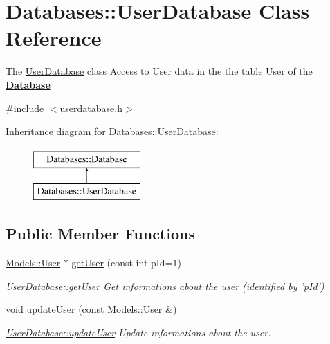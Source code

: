\hypertarget{classDatabases_1_1UserDatabase}{\section{Databases\-:\-:User\-Database Class Reference}
\label{classDatabases_1_1UserDatabase}
}


The \hyperlink{classDatabases_1_1UserDatabase}{User\-Database} class Access to User data in the the table User of the {\bfseries \hyperlink{classDatabases_1_1Database}{Database}}  




{\ttfamily \#include $<$userdatabase.\-h$>$}

Inheritance diagram for Databases\-:\-:User\-Database\-:\begin{figure}[H]
\begin{center}
\leavevmode
\includegraphics[height=2.000000cm]{d0/d33/classDatabases_1_1UserDatabase}
\end{center}
\end{figure}
\subsection*{Public Member Functions}
\begin{DoxyCompactItemize}
\item 
\hyperlink{classModels_1_1User}{Models\-::\-User} $\ast$ \hyperlink{classDatabases_1_1UserDatabase_a476a2b649cc61870a59d6f8df0b376e4}{get\-User} (const int p\-Id=1)
\begin{DoxyCompactList}\small\item\em \hyperlink{classDatabases_1_1UserDatabase_a476a2b649cc61870a59d6f8df0b376e4}{User\-Database\-::get\-User} Get informations about the user (identified by 'p\-Id') \end{DoxyCompactList}\item 
\hypertarget{classDatabases_1_1UserDatabase_a79cd7ce66a5dc13f91a59eb106edd871}{void \hyperlink{classDatabases_1_1UserDatabase_a79cd7ce66a5dc13f91a59eb106edd871}{update\-User} (const \hyperlink{classModels_1_1User}{Models\-::\-User} \&)}\label{classDatabases_1_1UserDatabase_a79cd7ce66a5dc13f91a59eb106edd871}

\begin{DoxyCompactList}\small\item\em \hyperlink{classDatabases_1_1UserDatabase_a79cd7ce66a5dc13f91a59eb106edd871}{User\-Database\-::update\-User} Update informations about the user. \end{DoxyCompactList}\end{DoxyCompactItemize}
